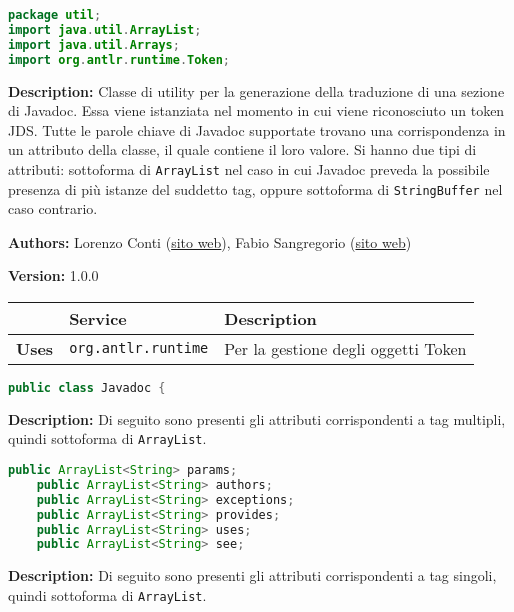 \begin{lstlisting}[language=Java]
package util;
import java.util.ArrayList;
import java.util.Arrays;
import org.antlr.runtime.Token;
\end{lstlisting}
\vspace{0.5cm}
\textbf{Description:}  Classe di utility per la generazione della traduzione di una sezione di Javadoc.  Essa viene istanziata nel momento in cui viene riconosciuto un token JDS. Tutte le parole chiave di Javadoc supportate trovano una corrispondenza in un attributo della classe, il quale contiene il loro valore. Si hanno due tipi di attributi: sottoforma di \texttt{ArrayList} nel caso in cui Javadoc preveda la possibile presenza di più istanze del suddetto tag, oppure sottoforma di \texttt{StringBuffer} nel caso contrario.  

\textbf{Authors:} Lorenzo Conti        (\href{https://www.lorenzoconti.dev}{sito web}), Fabio Sangregorio    (\href{https://fabio.sangregorio.dev}{sito web})

\textbf{Version:} 1.0.0

\begin{table}[!h]\centering
\begin{tabular}{|l|p{}|p{}|}
\hline & \textbf{Service} & \textbf{Description} \\ \hline
\multirow{1}{*}{\textbf{Uses}}
& \texttt{org.antlr.runtime} & Per la gestione degli oggetti Token \\
\hline
\end{tabular}\end{table}
\begin{lstlisting}[language=Java]
public class Javadoc {
\end{lstlisting}
\vspace{0.5cm}
\textbf{Description:}  Di seguito sono presenti gli attributi corrispondenti a tag multipli, quindi sottoforma di \texttt{ArrayList}.

\begin{lstlisting}[language=Java]
    public ArrayList<String> params;
    public ArrayList<String> authors;
    public ArrayList<String> exceptions;
    public ArrayList<String> provides;
    public ArrayList<String> uses;
    public ArrayList<String> see;
\end{lstlisting}
\vspace{0.5cm}
\textbf{Description:}  Di seguito sono presenti gli attributi corrispondenti a tag singoli, quindi sottoforma di \texttt{ArrayList}.

